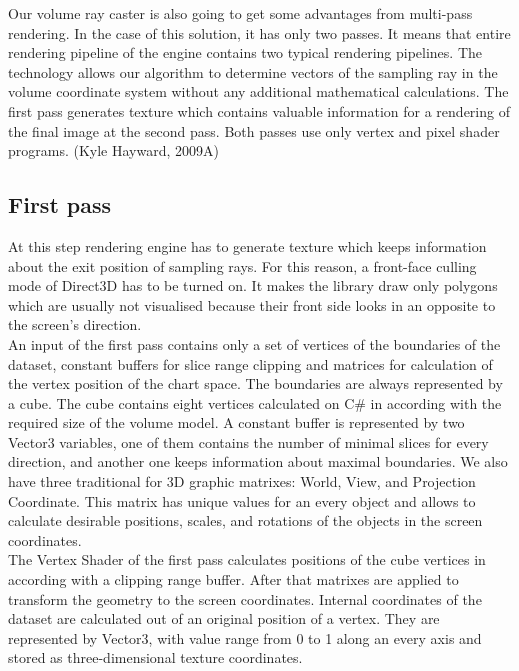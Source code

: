 \documentclass[twoside, english, 11pt]{report}
\begin{document}
Our volume ray caster is also going to get some advantages from multi-pass rendering. In the case of this solution, it has only two passes. It means that entire rendering pipeline of the engine contains two typical rendering pipelines. The technology allows our algorithm to determine vectors of the sampling ray in the volume coordinate system without any additional mathematical calculations. The first pass generates texture which contains valuable information for a rendering of the final image at the second pass. Both passes use only vertex and pixel shader programs. (Kyle Hayward, 2009A)

\subsection{First pass}

At this step rendering engine has to generate texture which keeps information about the exit position of sampling rays. For this reason, a front-face culling mode of Direct3D has to be turned on. It makes the library draw only polygons which are usually not visualised because their front side looks in an opposite to the screen's direction.\\

An input of the first pass contains only a set of vertices of the boundaries of the dataset, constant buffers for slice range clipping and matrices for calculation of the vertex position of the chart space. The boundaries are always represented by a cube. The cube contains eight vertices calculated on C\# in according with the required size of the volume model. A constant buffer is represented by two Vector3 variables, one of them contains the number of minimal slices for every direction, and another one keeps information about maximal boundaries. We also have three traditional for 3D graphic matrixes: World, View, and Projection Coordinate. This matrix has unique values for an every object and allows to calculate desirable positions, scales, and rotations of the objects in the screen coordinates.\\

The Vertex Shader of the first pass calculates positions of the cube vertices in according with a clipping range buffer. After that matrixes are applied to transform the geometry to the screen coordinates. Internal coordinates of the dataset are calculated out of an original position of a vertex. They are represented by Vector3, with value range from 0 to 1 along an every axis and stored as three-dimensional texture coordinates.\\
\end{document}
